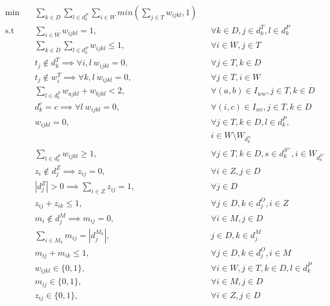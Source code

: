\documentclass[../../thesis.tex]{subfiles}
\begin{document}
\begin{align}
    \textrm{min} \quad & \sum_{k \in D} \sum_{l \in d^P_k} \sum_{i \in W} min(\sum_{j \in T} w_{ijkl}, 1) & \label{obj} \\ 
    \textrm{s.t} \quad & \sum_{i \in W} w_{ijkl} = 1, && \forall k \in D, j \in d_k^T, l \in d_k^P \label{wc1} \\
    & \sum_{k \in D} \sum_{l \in d_k^P} w_{ijkl} \leq 1, && \forall i \in W, j \in T \label{wc2} \\
    & t_j \notin d^T_{k} \implies \forall i, l \ w_{ijkl} = 0,  & &\forall j \in T , k \in D \label{wc3} \\
    & t_j \notin w^T_{i} \implies \forall k, l \ w_{ijkl} = 0, && \forall j \in T, i \in W \label{wc4} \\ 
    & \sum_{l \in d^P_k} w_{ajkl} + w_{bjkl} < 2, &&  \forall {(a, b) \in I_{ww}}, j \in T, k \in D \label{wc5} \\
    & d^c_{k} = c \implies \forall l \ w_{ijkl} = 0, && \forall {(i, c) \in I_{wc}}, j \in T, k \in D \label{wc6} \\ 
    & w_{ijkl} = 0, && \forall j \in T, k \in D, l \in d^P_k, \label{wc7} \\
    & && i \in W \setminus W_{d^{s_l}_k} \nonumber\\
    & \sum_{l \in d_k^P} w_{ijkl} \geq 1, && \forall j \in T, k \in D, s \in d^{S^+}_k, i \in W_{d^{S^+}_k} \label{wc8} \\ 
    & z_i \notin d^Z_j \implies z_{ij} = 0, && \forall i \in Z, j \in D \label{zc1}  \\
    & |d^Z_j| > 0 \implies \sum_{i \in Z} z_{ij} = 1, && \forall j \in D \label{zc2} \\
    & z_{ij} + z_{ik} \leq 1, && \forall j \in D, k \in d^O_j, i \in Z \label{zc3} \\
    & m_i \notin d^M_j \implies m_{ij} = 0, && \forall i \in M, j \in D  \label{mc1} \\
    & \sum_{i \in M_k} m_{ij} = |d^{M_k}_j|, && j \in D, k \in d^M_j  \label{mc2} \\
    & m_{ij} + m_{ik} \leq 1, && \forall j \in D, k \in d^O_j, i \in M  \label{mc3} \\
    & w_{ijkl} \in \{0, 1\}, && \forall i \in W, j \in T, k \in D, l \in d^P_k \label{binary1} \\
    & m_{ij} \in \{0, 1\}, && \forall i \in M, j \in D \label{binary2} \\ 
    & z_{ij} \in \{0, 1\}, && \forall i \in Z, j \in D \label{binary3}
\end{align}
    
\end{document}
